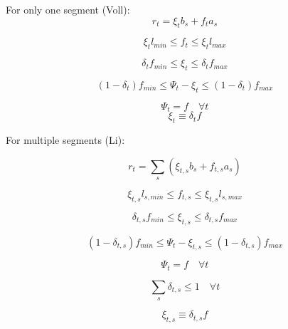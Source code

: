 \documentclass[10pt,twoside,a4paper]{report}
\begin{document}
For only one segment (Voll):
\begin{equation}
  r_t = \xi_t b_s + f_t a_s 
\end{equation}

\begin{equation}
  \xi_t l_{min} \leq f_t \leq \xi_t l_{max}
\end{equation}

\begin{equation}
  \delta_t f_{min} \leq \xi_t \leq \delta_t f_{max} 
\end{equation}

\begin{equation}
  (1-\delta_t)f_{min} \leq \Psi_t - \xi_t \leq (1-\delta_t)f_{max}
\end{equation}

\begin{equation}
  \Psi_t = f \quad \forall t
\end{equation}
\begin{equation}
  \xi_t \equiv  \delta_t f 
\end{equation}


For multiple segments (Li):

\begin{equation}
  r_t = \sum_s \left ( \xi_{t,s} b_s + f_{t,s} a_s \right ) 
\end{equation}

\begin{equation}
  \xi_{t,s} l_{s,min} \leq f_{t,s} \leq \xi_{t,s} l_{s,max}
\end{equation}

\begin{equation}
  \delta_{t,s} f_{min} \leq \xi_{t,s} \leq \delta_{t,s} f_{max} 
\end{equation}

\begin{equation}
  (1-\delta_{t,s})f_{min} \leq \Psi_{t} - \xi_{t,s} \leq (1-\delta_{t,s})f_{max}
\end{equation}

\begin{equation}
  \Psi_{t} = f \quad \forall t
\end{equation}

\begin{equation}
  \sum_s \delta_{t,s} \leq 1 \quad \forall t
\end{equation}

\begin{equation}
  \xi_{t,s} \equiv  \delta_{t,s} f 
\end{equation}
\end{document}
